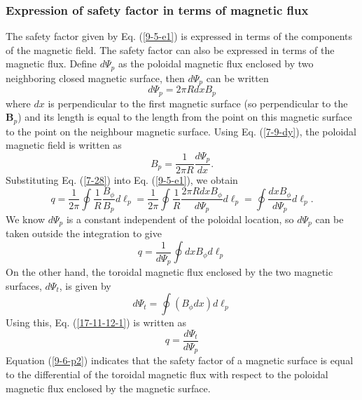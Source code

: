 \documentclass{article}
\begin{document}
\subsubsection{Expression of safety factor in terms of magnetic flux}

The safety factor given by Eq. (\ref{9-5-e1}) is expressed in terms of the
components of the magnetic field. The safety factor can also be expressed in
terms of the magnetic flux. Define $d \Psi_p$ as the poloidal magnetic flux
enclosed by two neighboring closed magnetic surface, then $d \Psi_p$ can be
written
\begin{equation}
  \label{7-9-dy} d \Psi_p = 2 \pi R d x B_p
\end{equation}
where $d x$ is perpendicular to the first magnetic surface (so perpendicular
to the $\mathbf{B}_p$) and its length is equal to the length from the point on
this magnetic surface to the point on the neighbour magnetic surface. Using
Eq. (\ref{7-9-dy}), the poloidal magnetic field is written as
\begin{equation}
  \label{7-28} B_p = \frac{1}{2 \pi R}  \frac{d \Psi_p}{d x} .
\end{equation}
Substituting Eq. (\ref{7-28}) into Eq. (\ref{9-5-e1}), we obtain
\begin{equation}
  q = \frac{1}{2 \pi} \oint \frac{1}{R} \frac{B_{\phi}}{B_p} d \ell_p =
  \frac{1}{2 \pi} \oint \frac{1}{R} \frac{2 \pi R d x B_{\phi}}{d \Psi_p} d
  \ell_p = \oint \frac{d x B_{\phi}}{d \Psi_p} d \ell_p .
\end{equation}
We know $d \Psi_p$ is a constant independent of the poloidal location, so $d
\Psi_p$ can be taken outside the integration to give
\begin{equation}
  \label{17-11-12-1} q = \frac{1}{d \Psi_p} \oint d x B_{\phi} d \ell_p
\end{equation}
On the other hand, the toroidal magnetic flux enclosed by the two magnetic
surfaces, $d \Psi_t$, is given by
\begin{equation}
  d \Psi_t = \oint (B_{\phi} d x) d \ell_p
\end{equation}
Using this, Eq. (\ref{17-11-12-1}) is written as
\begin{equation}
  \label{9-6-p2} q = \frac{d \Psi_t}{d \Psi_p}
\end{equation}
Equation (\ref{9-6-p2}) indicates that the safety factor of a magnetic surface
is equal to the differential of the toroidal magnetic flux with respect to the
poloidal magnetic flux enclosed by the magnetic surface.
\end{document}
